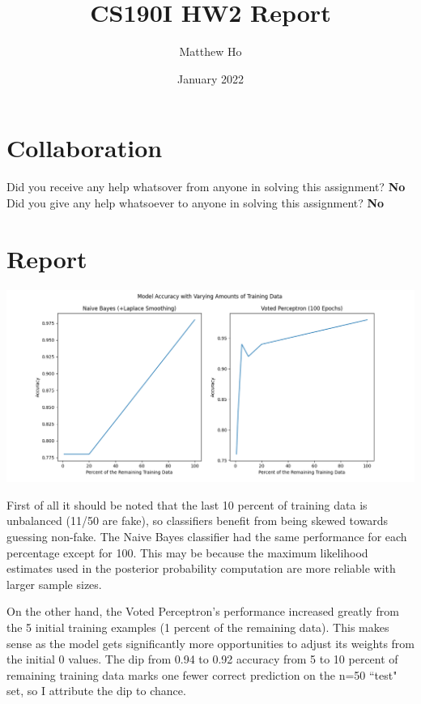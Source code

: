 \documentclass{article}
\title{CS190I HW2 Report}
\author{Matthew Ho}
\date{January 2022}
\begin{document}
\maketitle

\section{Collaboration}
Did you receive any help whatsover from anyone in solving this assignment? \textbf{No}\\
Did you give any help whatsoever to anyone in solving this assignment? \textbf{No}

\section{Report}
\begin{center}
\includegraphics[scale=0.5]{report_graphs}
\end{center}
First of all it should be noted that the last 10 percent of training data is unbalanced (11/50 are fake), so classifiers benefit from being skewed towards guessing non-fake. The Naive Bayes classifier had the same performance for each percentage except for 100. This may be because the maximum likelihood estimates used in the posterior probability computation are more reliable with larger sample sizes.

On the other hand, the Voted Perceptron's performance increased greatly from the 5 initial training examples (1 percent of the remaining data). This makes sense as the model gets significantly more opportunities to adjust its weights from the initial 0 values. The dip from 0.94 to 0.92 accuracy from 5 to 10 percent of remaining training data marks one fewer correct prediction on the n=50 ``test" set, so I attribute the dip to chance.
\end{document}
